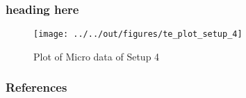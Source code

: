 \documentclass[11pt]{beamer}
\begin{document}
\begin{frame}
    \frametitle{heading here}
    
    \begin{figure}
        \caption{Plot of Micro data of Setup 4}
    
        \texttt{[image: ../../out/figures/te\_plot\_setup\_4]}

    \end{figure}

\end{frame}


 {
    \begin{frame}
        \frametitle{}
    \end{frame}

}

\begin{frame}[allowframebreaks]
    \frametitle{References}
    
    
    
    
\end{frame}
\end{document}
